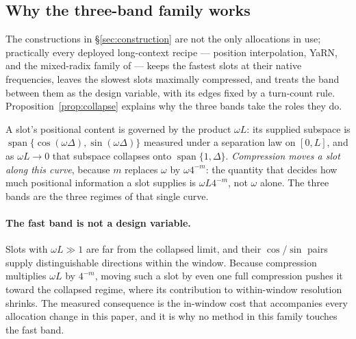 %

\subsection{Why the three-band family works}
\label{sec:threeband}

The constructions in \S\ref{sec:construction} are not the only allocations in use;
practically every deployed long-context recipe --- position interpolation, YaRN, and
the mixed-radix family of \citet{tian2026mrrope} --- keeps the fastest slots at their
native frequencies, leaves the slowest slots maximally compressed, and treats the
band between them as the design variable, with its edges fixed by a turn-count rule.
Proposition~\ref{prop:collapse} explains why the three bands take the roles they do.

A slot's positional content is governed by the product $\omega L$: its supplied
subspace is $\operatorname{span}\{\cos(\omega\Delta),\sin(\omega\Delta)\}$ measured
under a separation law on $[0,L]$, and as $\omega L\to0$ that subspace collapses onto
$\operatorname{span}\{1,\Delta\}$. \emph{Compression moves a slot along this curve},
because $m$ replaces $\omega$ by $\omega 4^{-m}$: the quantity that decides how much
positional information a slot supplies is $\omega L 4^{-m}$, not $\omega$ alone. The
three bands are the three regimes of that single curve.

\paragraph{The fast band is not a design variable.} Slots with $\omega L\gg1$ are far
from the collapsed limit, and their $\cos$/$\sin$ pairs supply distinguishable
directions within the window. Because compression multiplies $\omega L$ by $4^{-m}$,
moving such a slot by even one full compression pushes it toward the collapsed
regime, where its contribution to within-window resolution shrinks. The measured
consequence is the in-window cost that accompanies every allocation change in this
paper, and it is why no method in this family touches the fast band.

